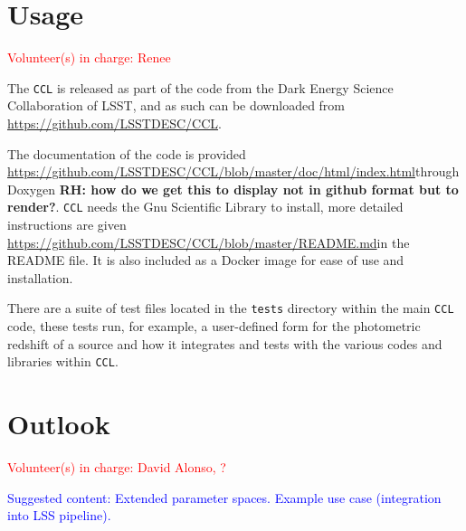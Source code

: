 \documentclass[\docopts]{\docclass}
\newcommand{\vol}[1]{\textcolor{red}{Volunteer(s) in charge: #1}}
\newcommand{\cont}[1]{\textcolor{blue}{Suggested content: #1}}
\newcommand{\ccl}{{\tt CCL}\xspace}
\begin{document}
\section{Usage}
\vol{Renee}

The \ccl is released as part of the code from the Dark Energy Science Collaboration of LSST, and as such can be downloaded from \url{https://github.com/LSSTDESC/CCL}.

The documentation of the code is provided \url{https://github.com/LSSTDESC/CCL/blob/master/doc/html/index.html}{through Doxygen} {\bf RH: how do we get this to display not in github format but to render?}.
\ccl needs the Gnu Scientific Library to install, more detailed instructions are given \url{https://github.com/LSSTDESC/CCL/blob/master/README.md}{in the README file}. It is also included as a Docker image for ease of use and installation.

There are a suite of test files located in the {\tt tests} directory within the main \ccl code, these tests run, for example, a user-defined form for the photometric redshift of a source and how it integrates and tests with the various codes and libraries within \ccl.

\section{Outlook}
\vol{David Alonso, ?}

\cont{Extended parameter spaces. Example use case (integration into LSS pipeline).}







\end{document}
